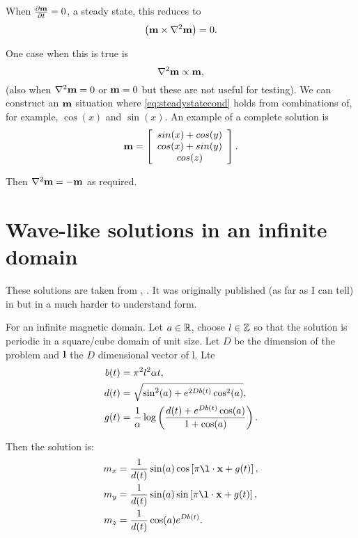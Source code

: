 When $\frac{\partial \mathbf{m}}{\partial t} = 0$, \ie a steady state, this reduces to
\begin{equation}
   \left( \mathbf{m} \times \nabla^2 \mathbf{m} \right) = 0.
\end{equation}

One case when this is true is
\begin{equation}
  \nabla^2 \mathbf{m} \propto \mathbf{m},
  \label{eq:steadystatecond}
\end{equation}
(also when $\nabla^2 \mathbf{m} = 0$ or $\mathbf{m} = 0$ but these are not useful for testing).
We can construct an $\mathbf{m}$ situation where \eqref{eq:steadystatecond} holds from combinations of, for example, $\cos(x)$ and $\sin(x)$.
An example of a complete solution is
\begin{equation}
  \mathbf{m} = \left[
    \begin{array}{c}
      sin(x) + cos(y) \\ cos(x) + sin(y) \\ cos(z)
    \end{array}
    \right].
\end{equation}

Then $\nabla^2 \mathbf{m} = - \mathbf{m}$ as required.

\section{Wave-like solutions in an infinite domain}

These solutions are taken from \cite{Jeong2014}, \cite{Fuwa2006}. It was originally published (as far as I can tell) in \cite{Lakshmanan1976} but in a much harder to understand form.

For an infinite magnetic domain. Let $a \in \mathbb{R}$, choose $l \in \mathbb{Z}$ so that the solution is periodic in a square/cube domain of unit size. Let $D$ be the dimension of the problem and $\mathbf{l}$ the $D$ dimensional vector of l. Lte
\begin{equation}
  \begin{aligned}
    b(t) &= \pi^2 l^2 \alpha t, \\
    d(t) &= \sqrt{\sin^2(a) + e^{2 D b(t)} \cos^2(a)}, \\
    g(t) &= \frac{1}{\alpha} \log \left( \frac{d(t) + e^{D b(t)} \cos(a)}{1 + \cos(a)} \right).
  \end{aligned}
\end{equation}

Then the solution is:
\begin{equation}
  \begin{aligned}
    m_x &= \frac{1}{d(t)} \sin(a) \cos\left[\pi \l \cdot \xv + g(t) \right], \\
    m_y &= \frac{1}{d(t)} \sin(a) \sin\left[\pi \l \cdot \xv + g(t) \right], \\
    m_z &= \frac{1}{d(t)} \cos(a) e^{D b(t)}.
  \end{aligned}
\end{equation}


